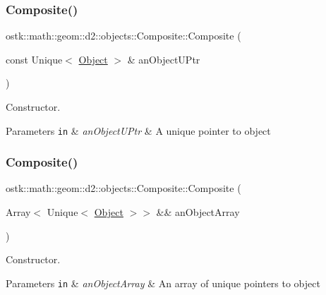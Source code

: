 \subsubsection{\texorpdfstring{Composite()}{Composite()}\hspace{0.1cm}{\footnotesize\ttfamily [2/4]}}
{\footnotesize\ttfamily ostk\+::math\+::geom\+::d2\+::objects\+::\+Composite\+::\+Composite (\begin{DoxyParamCaption}\item[{const Unique$<$ \hyperlink{classostk_1_1math_1_1geom_1_1d2_1_1_object}{Object} $>$ \&}]{an\+Object\+U\+Ptr }\end{DoxyParamCaption})\hspace{0.3cm}{\ttfamily [explicit]}}



Constructor. 


\begin{DoxyParams}[1]{Parameters}
\mbox{\tt in}  & {\em an\+Object\+U\+Ptr} & A unique pointer to object \\
\hline
\end{DoxyParams}
\mbox{\label{classostk_1_1math_1_1geom_1_1d2_1_1objects_1_1_composite_af6fa26d33868d3fe7d7b0bb77d9eaf3e}} 
\subsubsection{\texorpdfstring{Composite()}{Composite()}\hspace{0.1cm}{\footnotesize\ttfamily [3/4]}}
{\footnotesize\ttfamily ostk\+::math\+::geom\+::d2\+::objects\+::\+Composite\+::\+Composite (\begin{DoxyParamCaption}\item[{Array$<$ Unique$<$ \hyperlink{classostk_1_1math_1_1geom_1_1d2_1_1_object}{Object} $>$$>$ \&\&}]{an\+Object\+Array }\end{DoxyParamCaption})\hspace{0.3cm}{\ttfamily [explicit]}}



Constructor. 


\begin{DoxyParams}[1]{Parameters}
\mbox{\tt in}  & {\em an\+Object\+Array} & An array of unique pointers to object \\
\hline
\end{DoxyParams}
\mbox{\label{classostk_1_1math_1_1geom_1_1d2_1_1objects_1_1_composite_a26ccaef8131e6f9ee7bb34e4ccf850bc}} 
